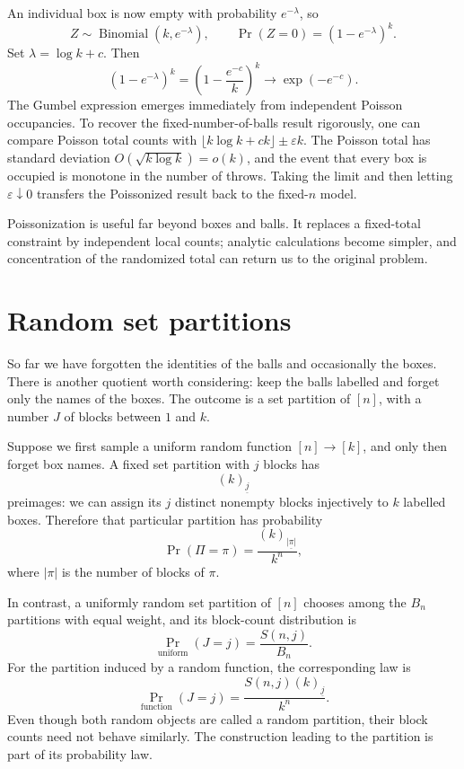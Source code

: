 An individual box is now empty with probability \(e^{-\lambda}\), so
\[
 \boxed{Z\sim\operatorname{Binomial}(k,e^{-\lambda}),\qquad
 \Pr(Z=0)=(1-e^{-\lambda})^k.}
\]
Set \(\lambda=\log k+c\). Then
\[
 (1-e^{-\lambda})^k
 =\left(1-\frac{e^{-c}}{k}\right)^k
 \longrightarrow\exp(-e^{-c}).
\]
The Gumbel expression emerges immediately from independent Poisson occupancies. To recover the fixed-number-of-balls result rigorously, one can compare Poisson total counts with \(\lfloor k\log k+ck\rfloor\pm\varepsilon k\). The Poisson total has standard deviation \(O(\sqrt{k\log k})=o(k)\), and the event that every box is occupied is monotone in the number of throws. Taking the limit and then letting \(\varepsilon\downarrow0\) transfers the Poissonized result back to the fixed-\(n\) model.

Poissonization is useful far beyond boxes and balls. It replaces a fixed-total constraint by independent local counts; analytic calculations become simpler, and concentration of the randomized total can return us to the original problem.

\section{Random set partitions}

So far we have forgotten the identities of the balls and occasionally the boxes. There is another quotient worth considering: keep the balls labelled and forget only the names of the boxes. The outcome is a set partition of \([n]\), with a number \(J\) of blocks between \(1\) and \(k\).

Suppose we first sample a uniform random function \([n]\to[k]\), and only then forget box names. A fixed set partition with \(j\) blocks has
\[
 (k)_{\underline j}
\]
preimages: we can assign its \(j\) distinct nonempty blocks injectively to \(k\) labelled boxes. Therefore that particular partition has probability
\[
 \boxed{\Pr(\Pi=\pi)
 =\frac{(k)_{\underline{|\pi|}}}{k^n},}
\]
where \(|\pi|\) is the number of blocks of \(\pi\).

In contrast, a uniformly random set partition of \([n]\) chooses among the \(B_n\) partitions with equal weight, and its block-count distribution is
\[
 \Pr_{\mathrm{uniform}}(J=j)=\frac{S(n,j)}{B_n}.
\]
For the partition induced by a random function, the corresponding law is
\[
 \Pr_{\mathrm{function}}(J=j)
 =\frac{S(n,j)(k)_{\underline j}}{k^n}.
\]
Even though both random objects are called a random partition, their block counts need not behave similarly. The construction leading to the partition is part of its probability law.

